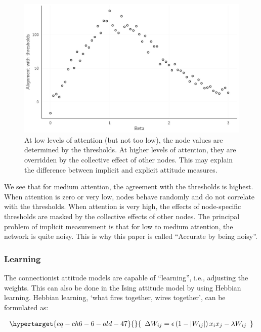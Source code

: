 \documentclass[
  a4paper,
  DIV=11,
  numbers=noendperiod,
  oneside]{scrreprt}
\begin{document}
\begin{figure}

{\centering \includegraphics{media/ch6/fig-ch6-img13-old-82.jpg}

}

\caption{\label{fig-ch6-img13-old-82}At low levels of attention (but not
too low), the node values are determined by the thresholds. At higher
levels of attention, they are overridden by the collective effect of
other nodes. This may explain the difference between implicit and
explicit attitude measures.}

\end{figure}

We see that for medium attention, the agreement with the thresholds is
highest. When attention is zero or very low, nodes behave randomly and
do not correlate with the thresholds. When attention is very high, the
effects of node-specific thresholds are masked by the collective effects
of other nodes. The principal problem of implicit measurement is that
for low to medium attention, the network is quite noisy. This is why
this paper is called ``Accurate by being noisy''.

\hypertarget{sec-Learning}{%
\subsubsection{Learning}\label{sec-Learning}}

The connectionist attitude models are capable of ``learning'', i.e.,
adjusting the weights. This can also be done in the Ising attitude model
by using Hebbian learning. Hebbian learning, `what fires together, wires
together', can be formulated as:

\begin{equation}\protect\hypertarget{eq-ch6-6-old-47}{}{\begin{array}{r}
\mathrm{\Delta}W_{ij} = \epsilon\left( 1 - \left| W_{ij} \right| \right)x_{i}x_{j} - \lambda W_{ij}
\end{array}}\label{eq-ch6-6-old-47}\end{equation}
\end{document}
